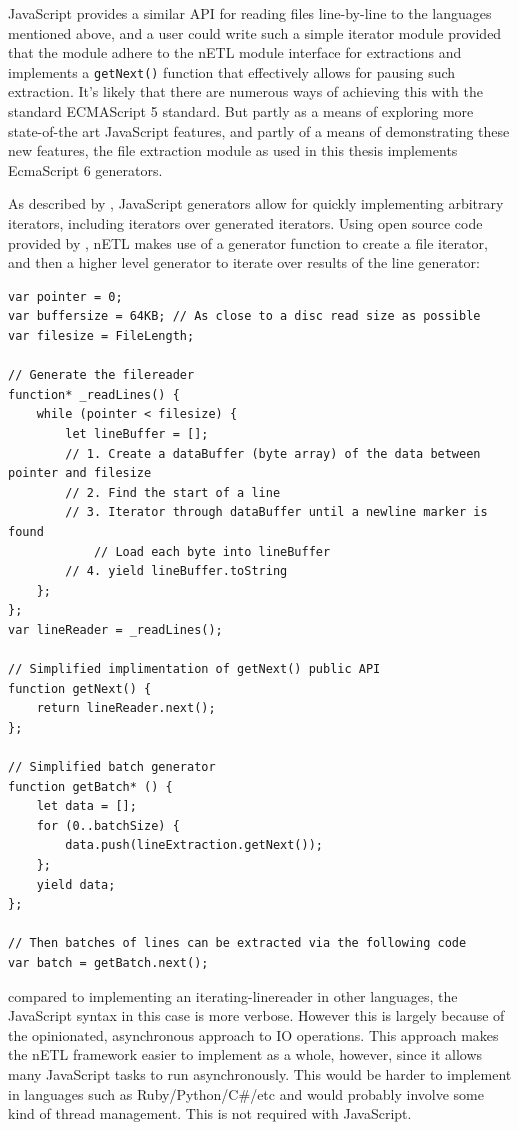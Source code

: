 JavaScript provides a similar API for reading files line-by-line to the languages mentioned above, and a user could write such a simple iterator module provided that the module adhere to the nETL module interface for extractions and implements a \texttt{getNext()} function that effectively allows for pausing such extraction. It's likely that there are numerous ways of achieving this with the standard ECMAScript 5 standard. But partly as a means of exploring more state-of-the art JavaScript features, and partly of a means of demonstrating these new features, the file extraction module as used in this thesis implements EcmaScript 6 generators.

As described by \cite{mozillaGenerators}, JavaScript generators allow for quickly implementing arbitrary iterators, including iterators over generated iterators. Using open source code provided by \cite{bower16}, nETL makes use of a generator function to create a file iterator, and then a higher level generator to iterate over results of the line generator:

\begin{verbatim}
var pointer = 0;
var buffersize = 64KB; // As close to a disc read size as possible
var filesize = FileLength;

// Generate the filereader
function* _readLines() {
    while (pointer < filesize) {
        let lineBuffer = [];
        // 1. Create a dataBuffer (byte array) of the data between pointer and filesize
        // 2. Find the start of a line
        // 3. Iterator through dataBuffer until a newline marker is found
            // Load each byte into lineBuffer
        // 4. yield lineBuffer.toString
    };
};
var lineReader = _readLines();

// Simplified implimentation of getNext() public API
function getNext() {
    return lineReader.next();
};

// Simplified batch generator
function getBatch* () {
    let data = [];
    for (0..batchSize) {
        data.push(lineExtraction.getNext());
    };
    yield data;
};

// Then batches of lines can be extracted via the following code
var batch = getBatch.next();
\end{verbatim}

compared to implementing an iterating-linereader in other languages, the JavaScript syntax in this case is more verbose. However this is largely because of the opinionated, asynchronous approach to IO operations. This approach makes the nETL framework easier to implement as a whole, however, since it allows many JavaScript tasks to run asynchronously. This would be harder to implement in languages such as Ruby/Python/C\#/etc and would probably involve some kind of thread management. This is not required with JavaScript.

